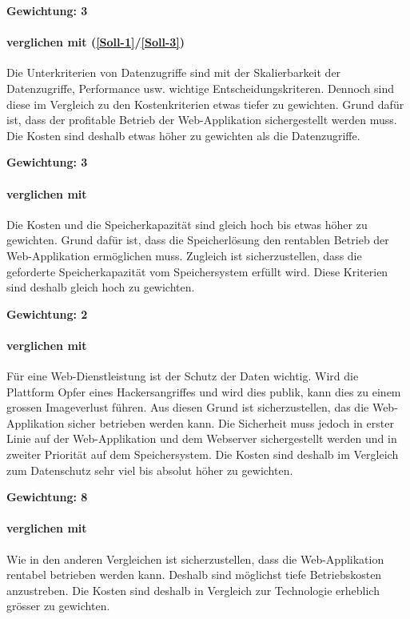 \textbf{Gewichtung: 3}

\paragraph*{ verglichen mit  (\ref{Soll-1}/\ref{Soll-3})}
Die Unterkriterien von Datenzugriffe sind mit der Skalierbarkeit der Datenzugriffe, Performance usw. wichtige Entscheidungskriteren. Dennoch sind diese im Vergleich zu den Kostenkriterien etwas tiefer zu gewichten. Grund dafür ist, dass der profitable Betrieb der Web-Applikation sichergestellt werden muss. Die Kosten sind deshalb etwas höher zu gewichten als die Datenzugriffe.

\textbf{Gewichtung: 3}

\paragraph*{ verglichen mit }
Die Kosten und die Speicherkapazität sind gleich hoch bis etwas höher zu gewichten. Grund dafür ist, dass die Speicherlösung den rentablen Betrieb der Web-Applikation ermöglichen muss. Zugleich ist sicherzustellen, dass die geforderte Speicherkapazität vom Speichersystem erfüllt wird. Diese Kriterien sind deshalb gleich hoch zu gewichten.

\textbf{Gewichtung: 2}

\paragraph*{ verglichen mit }
Für eine Web-Dienstleistung ist der Schutz der Daten wichtig. Wird die Plattform Opfer eines Hackersangriffes und wird dies publik, kann dies zu einem grossen Imageverlust führen. Aus diesen Grund ist sicherzustellen, das die Web-Applikation sicher betrieben werden kann. Die Sicherheit muss jedoch in erster Linie auf der Web-Applikation und dem Webserver sichergestellt werden und in zweiter Priorität auf dem Speichersystem. Die Kosten sind deshalb im Vergleich zum Datenschutz sehr viel bis absolut höher zu gewichten.

\textbf{Gewichtung: 8}

\paragraph*{ verglichen mit }
Wie in den anderen Vergleichen ist sicherzustellen, dass die Web-Applikation rentabel betrieben werden kann. Deshalb sind möglichst tiefe Betriebskosten anzustreben. Die Kosten sind deshalb in Vergleich zur Technologie erheblich grösser zu gewichten.

